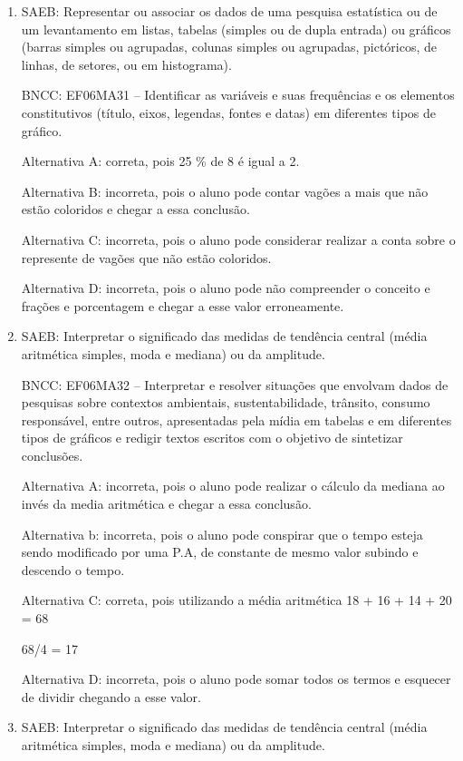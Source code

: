 
	\begin{enumerate}

		\item SAEB: Representar ou associar os dados de uma pesquisa estatística ou de
um levantamento em listas, tabelas (simples ou de dupla entrada) ou
gráficos (barras simples ou agrupadas, colunas simples ou agrupadas,
pictóricos, de linhas, de setores, ou em histograma).

BNCC: EF06MA31 -- Identificar as variáveis e suas frequências e os
elementos constitutivos (título, eixos, legendas, fontes e datas) em
diferentes tipos de gráfico.

Alternativa A: correta, pois 25 \% de 8 é igual a 2.

Alternativa B: incorreta, pois o aluno pode contar vagões a mais que não
estão coloridos e chegar a essa conclusão.

Alternativa C: incorreta, pois o aluno pode considerar realizar a conta
sobre o represente de vagões que não estão coloridos.

Alternativa D: incorreta, pois o aluno pode não compreender o conceito e
frações e porcentagem e chegar a esse valor erroneamente.

		\item SAEB: Interpretar o significado das medidas de tendência central (média
aritmética simples, moda e mediana) ou da amplitude.

BNCC: EF06MA32 -- Interpretar e resolver situações que envolvam dados de
pesquisas sobre contextos ambientais, sustentabilidade, trânsito,
consumo responsável, entre outros, apresentadas pela mídia em tabelas e
em diferentes tipos de gráficos e redigir textos escritos com o objetivo
de sintetizar conclusões.

Alternativa A: incorreta, pois o aluno pode realizar o cálculo da
mediana ao invés da media aritmética e chegar a essa conclusão.

Alternativa b: incorreta, pois o aluno pode conspirar que o tempo esteja
sendo modificado por uma P.A, de constante de mesmo valor subindo e
descendo o tempo.

Alternativa C: correta, pois utilizando a média aritmética 18 + 16 + 14
+ 20 = 68

68/4 = 17

Alternativa D: incorreta, pois o aluno pode somar todos os termos e
esquecer de dividir chegando a esse valor.

		\item SAEB: Interpretar o significado das medidas de tendência central (média
aritmética simples, moda e mediana) ou da amplitude.


\end{enumerate}
